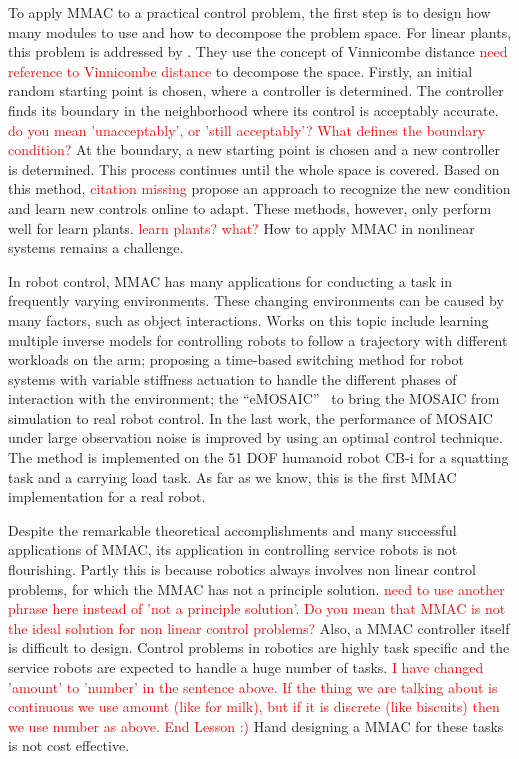 To apply MMAC to a practical control problem, the first step is to design how many modules to use and how to decompose the problem space. For linear plants, this problem is addressed by \citet{anderson2000multiple}. They use the concept of Vinnicombe distance 
\textcolor{red}{need reference to Vinnicombe distance}
to decompose the space. Firstly, an initial random starting point is chosen, where a controller is determined. The controller finds its boundary in the neighborhood where its control is acceptably accurate.
\textcolor{red}{do you mean 'unacceptably', or 'still acceptably'? What defines the boundary condition?}
At the boundary, a new starting point is chosen and a new controller is determined. This process continues until the whole space is covered. Based on this method, \citet{lourenco2006learning} 
\textcolor{red}{citation missing}
propose an approach to recognize the new condition and learn new controls online to adapt. These methods, however, only perform well for learn plants.
\textcolor{red}{learn plants? what?}
How to apply MMAC in nonlinear systems remains a challenge.

In robot control, MMAC has many applications for conducting a task in frequently varying environments. These changing environments can be caused by many factors, such as object interactions. Works on this topic include \citet{petkos2006learning} learning multiple inverse models for controlling robots to follow a trajectory with different workloads on the arm; \citet{nakanishi2013spatio} proposing a time-based switching method for robot systems with variable stiffness actuation to handle the different phases of interaction with the environment; the ``eMOSAIC''~\citep{sugimoto2012emosaic} to bring the MOSAIC from simulation to real robot control. In the last work, the performance of MOSAIC under large observation noise is improved by using an optimal control technique. The method is implemented on the 51 DOF humanoid robot CB-i for a squatting task and a carrying load task. As far as we know, this is the first MMAC implementation for a real robot.

Despite the remarkable theoretical accomplishments and many successful applications of MMAC, its application in controlling service robots is not flourishing. Partly this is because robotics always involves non linear control problems, for which the MMAC has not a principle solution.
\textcolor{red}{need to use another phrase here instead of 'not a principle solution'. Do you mean that MMAC is not the ideal solution for non linear control problems?} 
Also, a MMAC controller itself is difficult to design. Control problems in robotics are highly task specific and the service robots are expected to handle a huge number of tasks.
\textcolor{red}{I have changed 'amount' to 'number' in the sentence above. If the thing we are talking about is continuous we use amount (like for milk), but if it is discrete (like biscuits) then we use number as above. End Lesson :)}
 Hand designing a MMAC for these tasks is not cost effective. %

